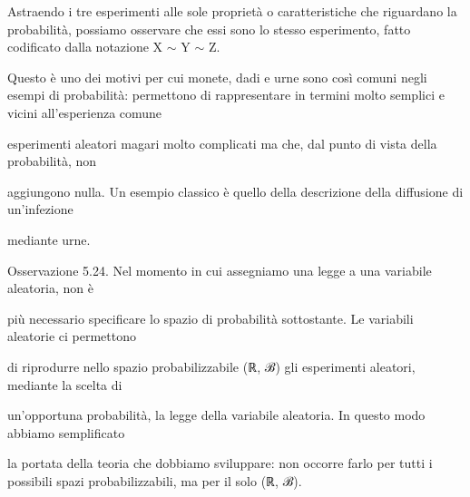 \documentclass[a4paper,portrait,12pt]{article}
\begin{document}
\begin{flushleft}
Astraendo i tre esperimenti alle sole propriet\`{a} o caratteristiche che riguardano la probabilit\`{a}, possiamo osservare che essi sono lo stesso esperimento, fatto codificato dalla notazione X $\sim$ Y $\sim$ Z.
\end{flushleft}


\begin{flushleft}
Questo \`{e} uno dei motivi per cui monete, dadi e urne sono così comuni negli esempi di probabilit\`{a}: permettono di rappresentare in termini molto semplici e vicini all'esperienza comune
\end{flushleft}


\begin{flushleft}
esperimenti aleatori magari molto complicati ma che, dal punto di vista della probabilit\`{a}, non
\end{flushleft}


\begin{flushleft}
aggiungono nulla. Un esempio classico \`{e} quello della descrizione della diffusione di un'infezione
\end{flushleft}


\begin{flushleft}
mediante urne.
\end{flushleft}


\begin{flushleft}
Osservazione 5.24. Nel momento in cui assegniamo una legge a una variabile aleatoria, non \`{e}
\end{flushleft}


\begin{flushleft}
più necessario specificare lo spazio di probabilit\`{a} sottostante. Le variabili aleatorie ci permettono
\end{flushleft}


\begin{flushleft}
di riprodurre nello spazio probabilizzabile (ℝ, ℬ) gli esperimenti aleatori, mediante la scelta di
\end{flushleft}


\begin{flushleft}
un'opportuna probabilit\`{a}, la legge della variabile aleatoria. In questo modo abbiamo semplificato
\end{flushleft}


\begin{flushleft}
la portata della teoria che dobbiamo sviluppare: non occorre farlo per tutti i possibili spazi probabilizzabili, ma per il solo (ℝ, ℬ).
\end{flushleft}
\end{document}
